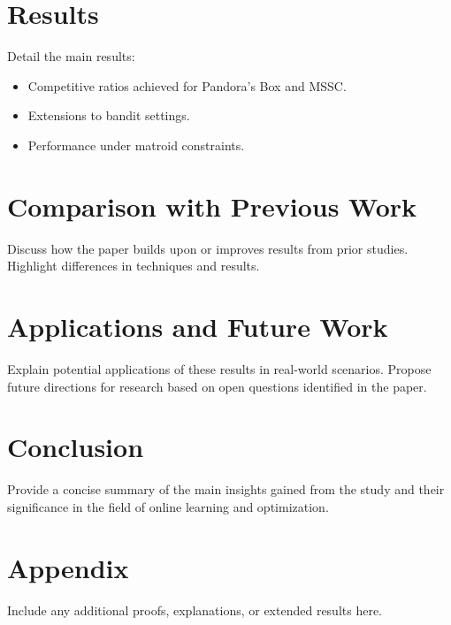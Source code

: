 \documentclass[11pt,a4paper]{article}
\begin{document}
\section{Results}
Detail the main results:
\begin{itemize}
    \item Competitive ratios achieved for Pandora's Box and MSSC.
    \item Extensions to bandit settings.
    \item Performance under matroid constraints.
\end{itemize}

\section{Comparison with Previous Work}
Discuss how the paper builds upon or improves results from prior studies. Highlight differences in techniques and results.

\section{Applications and Future Work}
Explain potential applications of these results in real-world scenarios. Propose future directions for research based on open questions identified in the paper.

\section{Conclusion}
Provide a concise summary of the main insights gained from the study and their significance in the field of online learning and optimization.

\appendix
\section{Appendix}
Include any additional proofs, explanations, or extended results here.



\end{document}
